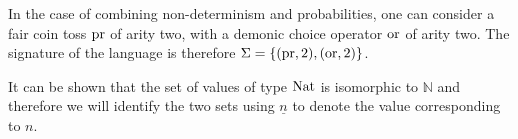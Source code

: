 \begin{example}
    In the case of combining non-determinism and probabilities, one can
    consider a fair coin toss $\operatorname{pr}$ of arity two, with a demonic 
    choice operator $\operatorname{or}$ of arity two. The signature of the language 
    is therefore $\Sigma = \{ (\operatorname{pr},2), (\operatorname{or},2) \}$.
\end{example}


It can be shown that the set of values of type $\textnormal{Nat}$ is isomorphic to $\mathbb{N}$
and therefore we will identify the two sets using $\underline{n}$ to denote 
the value corresponding to $n$.
